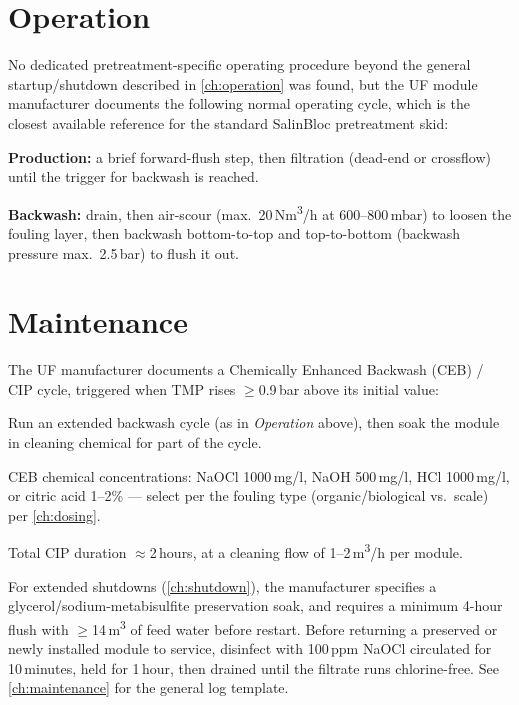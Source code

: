 \documentclass[a4paper,11pt,twoside,openright,numbers=noenddot]{scrreprt}
\newcommand{\salinbloc}{SalinBloc\texttrademark\xspace}
\begin{document}
\section{Operation}
No dedicated pretreatment-specific operating procedure beyond the general
startup/shutdown described in \cref{ch:operation} was found, but the UF
module manufacturer documents the following normal operating cycle, which
is the closest available reference for the standard \salinbloc pretreatment
skid:
\begin{procedure}
\item \textbf{Production:} a brief forward-flush step, then filtration
  (dead-end or crossflow) until the trigger for backwash is reached.
\item \textbf{Backwash:} drain, then air-scour (max.\
  20\,Nm\textsuperscript{3}/h at 600--800\,mbar) to loosen the fouling
  layer, then backwash bottom-to-top and top-to-bottom
  (backwash pressure max.\ 2.5\,bar) to flush it out.
\end{procedure}

\section{Maintenance}
The UF manufacturer documents a Chemically Enhanced Backwash (CEB) /
CIP cycle, triggered when TMP rises $\geq$0.9\,bar above its initial
value:
\begin{procedure}
\item Run an extended backwash cycle (as in \emph{Operation} above), then
  soak the module in cleaning chemical for part of the cycle.
\item CEB chemical concentrations: NaOCl 1000\,mg/l, NaOH 500\,mg/l, HCl
  1000\,mg/l, or citric acid 1--2\% --- select per the fouling type
  (organic/biological vs.\ scale) per \cref{ch:dosing}.
\item Total CIP duration $\approx$2\,hours, at a cleaning flow of
  1--2\,m\textsuperscript{3}/h per module.
\end{procedure}
For extended shutdowns (\cref{ch:shutdown}), the manufacturer specifies a
glycerol/sodium-metabisulfite preservation soak, and requires a minimum
4-hour flush with $\geq$14\,m\textsuperscript{3} of feed water before
restart. Before returning a preserved or newly installed module to
service, disinfect with 100\,ppm NaOCl circulated for 10\,minutes, held
for 1\,hour, then drained until the filtrate runs chlorine-free. See
\cref{ch:maintenance} for the general log template.
\end{document}
